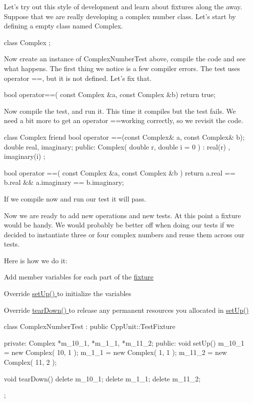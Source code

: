 Let's try out this style of development and learn about fixtures along the away. Suppose that we are really developing a complex number class. Let's start by defining a empty class named Complex.


\begin{DoxyCode}
class Complex {};
\end{DoxyCode}


Now create an instance of ComplexNumberTest above, compile the code and see what happens. The first thing we notice is a few compiler errors. The test uses {\ttfamily operator ==}, but it is not defined. Let's fix that.


\begin{DoxyCode}
bool operator==( const Complex &a, const Complex &b) 
{ 
  return true; 
}
\end{DoxyCode}


Now compile the test, and run it. This time it compiles but the test fails. We need a bit more to get an {\ttfamily operator ==}working correctly, so we revisit the code.


\begin{DoxyCode}
class Complex { 
  friend bool operator ==(const Complex& a, const Complex& b);
  double real, imaginary;
public:
  Complex( double r, double i = 0 ) 
    : real(r)
        , imaginary(i) 
  {
  }
};

bool operator ==( const Complex &a, const Complex &b )
{ 
  return a.real == b.real  &&  a.imaginary == b.imaginary; 
}
\end{DoxyCode}


If we compile now and run our test it will pass.

Now we are ready to add new operations and new tests. At this point a fixture would be handy. We would probably be better off when doing our tests if we decided to instantiate three or four complex numbers and reuse them across our tests.

Here is how we do it:
\begin{DoxyItemize}
\item Add member variables for each part of the \hyperlink{}{fixture }
\item Override \hyperlink{}{setUp() } to initialize the variables
\item Override \hyperlink{}{tearDown() } to release any permanent resources you allocated in \hyperlink{}{setUp() }
\end{DoxyItemize}


\begin{DoxyCode}
class ComplexNumberTest : public CppUnit::TestFixture {
private:
  Complex *m_10_1, *m_1_1, *m_11_2;
public:
  void setUp()
  {
    m_10_1 = new Complex( 10, 1 );
    m_1_1 = new Complex( 1, 1 );
    m_11_2 = new Complex( 11, 2 );  
  }

  void tearDown() 
  {
    delete m_10_1;
    delete m_1_1;
    delete m_11_2;
  }
};
\end{DoxyCode}


